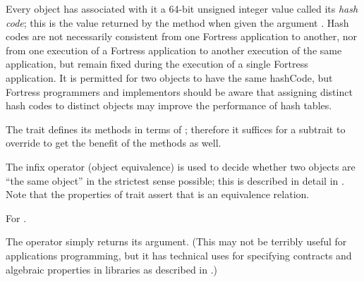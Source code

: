
Every object has associated with it a 64-bit unsigned integer value called its \emph{hash code};
this is the value returned by the  method when given the argument .
Hash codes are not necessarily consistent from one Fortress application to another, nor from
one execution of a Fortress application to another execution of the same application,
but remain fixed during the execution of a single Fortress application.
It is permitted for two objects to have the same hashCode, but Fortress programmers and
implementors should be aware that assigning distinct hash codes to distinct objects
may improve the performance of hash tables.

The trait  defines its  methods in terms of ;
therefore it suffices for a subtrait to override  to get the benefit
of the  methods as well.



The infix operator \EXP{\sequiv} (object equivalence) is used to
decide whether two objects are ``the same object'' in the strictest
sense possible; this is described in detail in .
Note that the properties of trait  assert that \EXP{\sequiv}
is an equivalence relation.

For \EXP{\not\sequiv} .


The operator  simply returns its argument.  (This may not be
terribly useful for applications programming, but it has technical uses for
specifying contracts and algebraic properties in libraries as described in
.)



